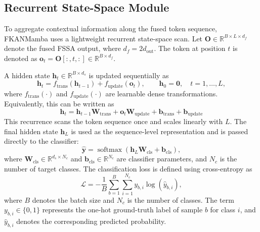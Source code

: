 \documentclass{ieeeaccess}
\begin{document}
\subsection{Recurrent State-Space Module}
\label{sec:ssm}

To aggregate contextual information along the fused token sequence, FKANMamba uses a lightweight recurrent state-space scan. Let
$\mathbf{O}\in\mathbb{R}^{B\times L\times d_f}$ denote the fused FSSA output, where $d_f=2d_{\mathrm{out}}$. The token at position $t$ is denoted as
$\mathbf{o}_{t}=\mathbf{O}[:,t,:]\in\mathbb{R}^{B\times d_f}$.

A hidden state $\mathbf{h}_{t}\in\mathbb{R}^{B\times d_s}$ is updated sequentially as
\begin{equation}
\mathbf{h}_{t}
=
f_{\mathrm{trans}}(\mathbf{h}_{t-1})
+
f_{\mathrm{update}}(\mathbf{o}_{t}),
\qquad
\mathbf{h}_{0}=\mathbf{0},
\quad
t=1,\ldots,L,
\label{eq:ssm_update_general}
\end{equation}
where $f_{\mathrm{trans}}(\cdot)$ and $f_{\mathrm{update}}(\cdot)$ are learnable dense transformations. Equivalently, this can be written as
\begin{equation}
\mathbf{h}_{t}
=
\mathbf{h}_{t-1}\mathbf{W}_{\mathrm{trans}}
+
\mathbf{o}_{t}\mathbf{W}_{\mathrm{update}}
+ \mathbf{b}_{\mathrm{trans}}
+
\mathbf{b}_{\mathrm{update}}
\label{eq:ssm_update}
\end{equation}
This recurrence scans the token sequence once and scales linearly with $L$. The final hidden state $\mathbf{h}_{L}$ is used as the sequence-level representation and is passed directly to the classifier:
\begin{equation}
\widehat{\mathbf{y}}
=
\operatorname{softmax}
\left(
\mathbf{h}_{L}\mathbf{W}_{\mathrm{cls}}
+
\mathbf{b}_{\mathrm{cls}}
\right),
\label{eq:ssm_softmax}
\end{equation}
where $\mathbf{W}_{\mathrm{cls}}\in\mathbb{R}^{d_s\times N_c}$ and
$\mathbf{b}_{\mathrm{cls}}\in\mathbb{R}^{N_c}$ are classifier parameters, and $N_c$ is the number of target classes. The classification loss is defined using cross-entropy as
\begin{equation}
\mathcal{L}
=
-\frac{1}{B}
\sum_{b=1}^{B}
\sum_{i=1}^{N_c}
y_{b,i}
\log
\left(
\widehat{y}_{b,i}
\right),
\label{eq:ce_loss}
\end{equation}
where $B$ denotes the batch size and ${N_c}$ is the number of classes. The term $y_{b,i}\in\{0,1\}$ represents the one-hot ground-truth label of sample $b$ for class $i$, and $\widehat{y}_{b,i}$ denotes the corresponding predicted probability.
\end{document}
